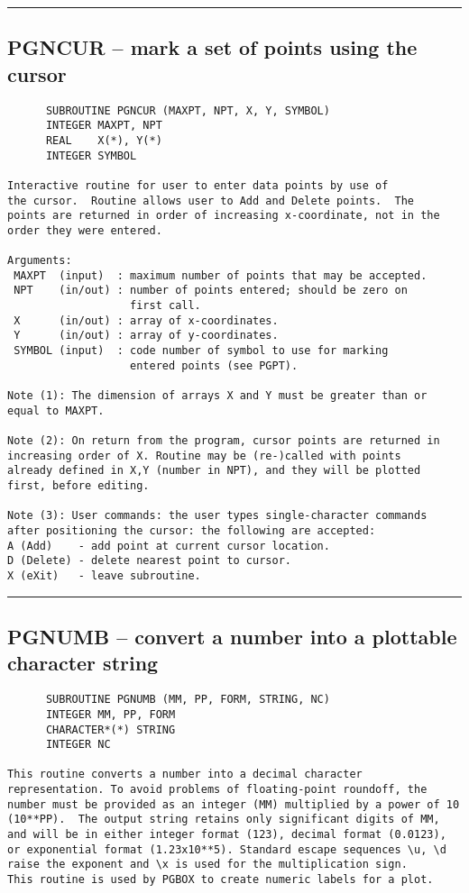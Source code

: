 {\begin{verbatim}
\end{verbatim}
\hrule


\subsection*{PGNCUR -- mark a set of points using the cursor }
\begin{verbatim}
      SUBROUTINE PGNCUR (MAXPT, NPT, X, Y, SYMBOL)
      INTEGER MAXPT, NPT
      REAL    X(*), Y(*)
      INTEGER SYMBOL

Interactive routine for user to enter data points by use of
the cursor.  Routine allows user to Add and Delete points.  The
points are returned in order of increasing x-coordinate, not in the
order they were entered.

Arguments:
 MAXPT  (input)  : maximum number of points that may be accepted.
 NPT    (in/out) : number of points entered; should be zero on
                   first call.
 X      (in/out) : array of x-coordinates.
 Y      (in/out) : array of y-coordinates.
 SYMBOL (input)  : code number of symbol to use for marking
                   entered points (see PGPT).

Note (1): The dimension of arrays X and Y must be greater than or
equal to MAXPT.

Note (2): On return from the program, cursor points are returned in
increasing order of X. Routine may be (re-)called with points
already defined in X,Y (number in NPT), and they will be plotted
first, before editing.

Note (3): User commands: the user types single-character commands
after positioning the cursor: the following are accepted:
A (Add)    - add point at current cursor location.
D (Delete) - delete nearest point to cursor.
X (eXit)   - leave subroutine.
\end{verbatim}
\hrule


\subsection*{PGNUMB -- convert a number into a plottable character string }
\begin{verbatim}
      SUBROUTINE PGNUMB (MM, PP, FORM, STRING, NC)
      INTEGER MM, PP, FORM
      CHARACTER*(*) STRING
      INTEGER NC

This routine converts a number into a decimal character
representation. To avoid problems of floating-point roundoff, the
number must be provided as an integer (MM) multiplied by a power of 10
(10**PP).  The output string retains only significant digits of MM,
and will be in either integer format (123), decimal format (0.0123),
or exponential format (1.23x10**5). Standard escape sequences \u, \d 
raise the exponent and \x is used for the multiplication sign.
This routine is used by PGBOX to create numeric labels for a plot.


\end{verbatim}}
